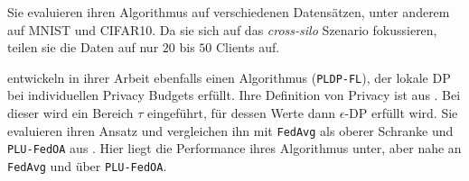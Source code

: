 Sie evaluieren ihren Algorithmus auf verschiedenen Datensätzen, unter anderem auf MNIST und CIFAR10. Da sie sich auf das \textit{cross-silo} Szenario fokussieren, teilen sie die Daten auf nur $20$ bis $50$ Clients auf.

\textcite{shen:2023} entwickeln in ihrer Arbeit ebenfalls einen Algorithmus (\texttt{PLDP-FL}), der lokale DP bei individuellen Privacy Budgets erfüllt. Ihre Definition von Privacy ist aus \textcite{chen:2016}. Bei dieser wird ein Bereich $\tau$ eingeführt, für dessen Werte dann $\epsilon$-DP erfüllt wird. Sie evaluieren ihren Ansatz und vergleichen ihn mit \texttt{FedAvg} \parencite{mcmahan:2016} als oberer Schranke und \texttt{PLU-FedOA} aus \textcite{yang:2021}. Hier liegt die Performance ihres Algorithmus unter, aber nahe an \texttt{FedAvg} und über \texttt{PLU-FedOA}. 
